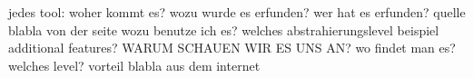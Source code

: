 jedes tool:\newline
woher kommt es?\newline
wozu wurde es erfunden?\newline
wer hat es erfunden? quelle\newline
blabla von der seite\newline
wozu benutze ich es?\newline
welches abstrahierungslevel\newline
beispiel\newline
additional features?\newline
WARUM SCHAUEN WIR ES UNS AN?\newline
wo findet man es?\newline
welches level?\newline
vorteil\newline
blabla aus dem internet\newline
